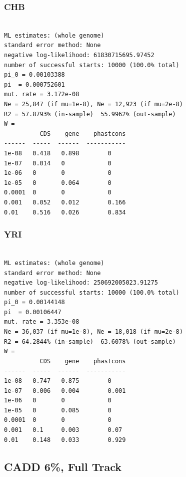 \documentclass[11pt]{article}
\begin{document}
\subsubsection*{CHB}
\begin{minipage}{\linewidth}\begin{footnotesize}
\begin{verbatim}

ML estimates: (whole genome)
standard error method: None
negative log-likelihood: 61830715695.97452
number of successful starts: 10000 (100.0% total)
pi_0 = 0.00103388
pi  = 0.000752601
mut. rate = 3.172e-08 
Ne = 25,847 (if mu=1e-8), Ne = 12,923 (if mu=2e-8)
R2 = 57.8793% (in-sample)  55.9962% (out-sample)
W = 
          CDS    gene    phastcons
------  -----  ------  -----------
1e-08   0.418   0.898        0
1e-07   0.014   0            0
1e-06   0       0            0
1e-05   0       0.064        0
0.0001  0       0            0
0.001   0.052   0.012        0.166
0.01    0.516   0.026        0.834
\end{verbatim}
\end{footnotesize}\end{minipage}


\subsubsection*{YRI}
\begin{minipage}{\linewidth}\begin{footnotesize}
\begin{verbatim}

ML estimates: (whole genome)
standard error method: None
negative log-likelihood: 250692005023.91275
number of successful starts: 10000 (100.0% total)
pi_0 = 0.00144148
pi  = 0.00106447
mut. rate = 3.353e-08 
Ne = 36,037 (if mu=1e-8), Ne = 18,018 (if mu=2e-8)
R2 = 64.2844% (in-sample)  63.6078% (out-sample)
W = 
          CDS    gene    phastcons
------  -----  ------  -----------
1e-08   0.747   0.875        0
1e-07   0.006   0.004        0.001
1e-06   0       0            0
1e-05   0       0.085        0
0.0001  0       0            0
0.001   0.1     0.003        0.07
0.01    0.148   0.033        0.929
\end{verbatim}
\end{footnotesize}\end{minipage}


\subsection{CADD 6\%, Full Track}
\end{document}
